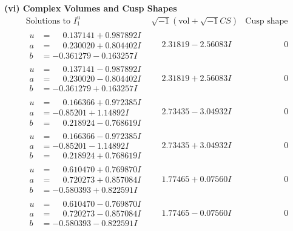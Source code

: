 \documentclass[1p]{elsarticle_modified}
\theoremstyle{definition}
\newcommand{\I}{\sqrt{-1}}
\begin{document}
\newpage\flushleft \textbf{(vi) Complex Volumes and Cusp Shapes}
$$\begin{array}{c|c|c}  
\text{Solutions to }I^u_{1}& \I (\text{vol} + \sqrt{-1}CS) & \text{Cusp shape}\\
 \hline 
\begin{aligned}
u &= \phantom{-}0.137141 + 0.987892 I \\
a &= \phantom{-}0.230020 + 0.804402 I \\
b &= -0.361279 - 0.163257 I\end{aligned}
 & \phantom{-}2.31819 - 2.56083 I & \phantom{-0.000000 } 0 \\ \hline\begin{aligned}
u &= \phantom{-}0.137141 - 0.987892 I \\
a &= \phantom{-}0.230020 - 0.804402 I \\
b &= -0.361279 + 0.163257 I\end{aligned}
 & \phantom{-}2.31819 + 2.56083 I & \phantom{-0.000000 } 0 \\ \hline\begin{aligned}
u &= \phantom{-}0.166366 + 0.972385 I \\
a &= -0.85201 + 1.14892 I \\
b &= \phantom{-}0.218924 - 0.768619 I\end{aligned}
 & \phantom{-}2.73435 - 3.04932 I & \phantom{-0.000000 } 0 \\ \hline\begin{aligned}
u &= \phantom{-}0.166366 - 0.972385 I \\
a &= -0.85201 - 1.14892 I \\
b &= \phantom{-}0.218924 + 0.768619 I\end{aligned}
 & \phantom{-}2.73435 + 3.04932 I & \phantom{-0.000000 } 0 \\ \hline\begin{aligned}
u &= \phantom{-}0.610470 + 0.769870 I \\
a &= \phantom{-}0.720273 + 0.857084 I \\
b &= -0.580393 + 0.822591 I\end{aligned}
 & \phantom{-}1.77465 + 0.07560 I & \phantom{-0.000000 } 0 \\ \hline\begin{aligned}
u &= \phantom{-}0.610470 - 0.769870 I \\
a &= \phantom{-}0.720273 - 0.857084 I \\
b &= -0.580393 - 0.822591 I\end{aligned}
 & \phantom{-}1.77465 - 0.07560 I & \phantom{-0.000000 } 0 \\ \hline\begin{aligned}

\end{aligned}
\end{array}$$
\end{document}
